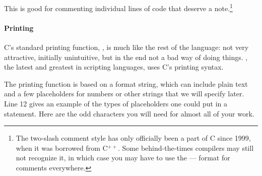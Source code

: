 This is good for commenting individual lines of code that deserve a
note.\footnote{The two-slash comment style has only officially been
a part of C since 1999, when it was borrowed from C$^{++}$. Some
behind-the-times compilers may still not recognize it, in which case
you may have to use the \ci{/*} --- \ci{*/} format for comments
everywhere.}


\paragraph{Printing}
\label{printf}
C's standard printing function, , is much like the rest of
the language: not very attractive, initially unintuitive, but in the end
not a bad way of doing things. , the latest and greatest in
scripting languages, uses C's printing syntax.

The printing function is based on a format string, which
can include plain text and a few placeholders for numbers or other
strings that we will specify later. Line 12 gives an example of the
types of placeholders one could put in a  statement.
Here are the odd characters you
will need for almost all of your work. 

\begin{center}
\end{center}

